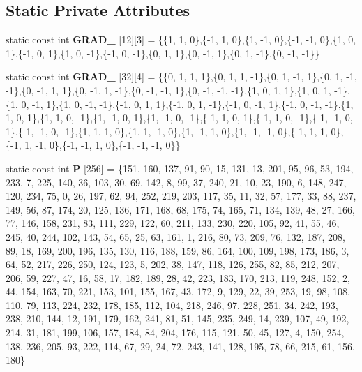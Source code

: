 \subsection*{Static Private Attributes}
\begin{DoxyCompactItemize}
\item 
\mbox{\label{classflounder_1_1noisesimplex_a3fa20131f685a17f458d1a438d9315d6}} 
static const int {\bfseries G\+R\+A\+D\+\_} \mbox{[}12\mbox{]}\mbox{[}3\mbox{]} = \{\{1, 1, 0\},\{-\/1, 1, 0\},\{1, -\/1, 0\},\{-\/1, -\/1, 0\},\{1, 0, 1\},\{-\/1, 0, 1\},\{1, 0, -\/1\},\{-\/1, 0, -\/1\},\{0, 1, 1\},\{0, -\/1, 1\},\{0, 1, -\/1\},\{0, -\/1, -\/1\}\}
\item 
\mbox{\label{classflounder_1_1noisesimplex_a2f4afb1f7e2700c5324c738e39fa922e}} 
static const int {\bfseries G\+R\+A\+D\+\_} \mbox{[}32\mbox{]}\mbox{[}4\mbox{]} = \{\{0, 1, 1, 1\},\{0, 1, 1, -\/1\},\{0, 1, -\/1, 1\},\{0, 1, -\/1, -\/1\},\{0, -\/1, 1, 1\},\{0, -\/1, 1, -\/1\},\{0, -\/1, -\/1, 1\},\{0, -\/1, -\/1, -\/1\},\{1, 0, 1, 1\},\{1, 0, 1, -\/1\},\{1, 0, -\/1, 1\},\{1, 0, -\/1, -\/1\},\{-\/1, 0, 1, 1\},\{-\/1, 0, 1, -\/1\},\{-\/1, 0, -\/1, 1\},\{-\/1, 0, -\/1, -\/1\},\{1, 1, 0, 1\},\{1, 1, 0, -\/1\},\{1, -\/1, 0, 1\},\{1, -\/1, 0, -\/1\},\{-\/1, 1, 0, 1\},\{-\/1, 1, 0, -\/1\},\{-\/1, -\/1, 0, 1\},\{-\/1, -\/1, 0, -\/1\},\{1, 1, 1, 0\},\{1, 1, -\/1, 0\},\{1, -\/1, 1, 0\},\{1, -\/1, -\/1, 0\},\{-\/1, 1, 1, 0\},\{-\/1, 1, -\/1, 0\},\{-\/1, -\/1, 1, 0\},\{-\/1, -\/1, -\/1, 0\}\}
\item 
\mbox{\label{classflounder_1_1noisesimplex_ae53c7b8b5ba9878dd75e6b1b87a6dba0}} 
static const int {\bfseries P} \mbox{[}256\mbox{]} = \{151, 160, 137, 91, 90, 15, 131, 13, 201, 95, 96, 53, 194, 233, 7, 225, 140, 36, 103, 30, 69, 142, 8, 99, 37, 240, 21, 10, 23, 190, 6, 148, 247, 120, 234, 75, 0, 26, 197, 62, 94, 252, 219, 203, 117, 35, 11, 32, 57, 177, 33, 88, 237, 149, 56, 87, 174, 20, 125, 136, 171, 168, 68, 175, 74, 165, 71, 134, 139, 48, 27, 166, 77, 146, 158, 231, 83, 111, 229, 122, 60, 211, 133, 230, 220, 105, 92, 41, 55, 46, 245, 40, 244, 102, 143, 54, 65, 25, 63, 161, 1, 216, 80, 73, 209, 76, 132, 187, 208, 89, 18, 169, 200, 196, 135, 130, 116, 188, 159, 86, 164, 100, 109, 198, 173, 186, 3, 64, 52, 217, 226, 250, 124, 123, 5, 202, 38, 147, 118, 126, 255, 82, 85, 212, 207, 206, 59, 227, 47, 16, 58, 17, 182, 189, 28, 42, 223, 183, 170, 213, 119, 248, 152, 2, 44, 154, 163, 70, 221, 153, 101, 155, 167, 43, 172, 9, 129, 22, 39, 253, 19, 98, 108, 110, 79, 113, 224, 232, 178, 185, 112, 104, 218, 246, 97, 228, 251, 34, 242, 193, 238, 210, 144, 12, 191, 179, 162, 241, 81, 51, 145, 235, 249, 14, 239, 107, 49, 192, 214, 31, 181, 199, 106, 157, 184, 84, 204, 176, 115, 121, 50, 45, 127, 4, 150, 254, 138, 236, 205, 93, 222, 114, 67, 29, 24, 72, 243, 141, 128, 195, 78, 66, 215, 61, 156, 180\}

\end{DoxyCompactItemize}
